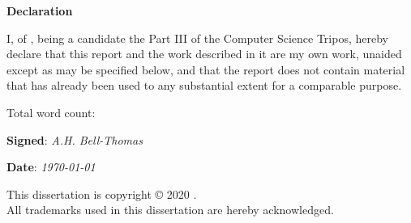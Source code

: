 \newpage
{\Huge \bf Declaration}

\vspace{24pt} 

I, \authorname of \authorcollege, being a candidate the Part III of
the Computer Science Tripos, hereby declare that this report and the
work described in it are my own work, unaided except as may be
specified below, and that the report does not contain material that
has already been used to any substantial extent for a comparable
purpose.

\vspace{24pt}
Total word count: \wordcount

\vspace{60pt}
\textbf{Signed}: \textit{A.H. Bell-Thomas}

\vspace{12pt}
\textbf{Date}: \textit{\today}


\vfill

This dissertation is copyright \copyright{} 2020 \authorname. 
\\
All trademarks used in this dissertation are hereby acknowledged.



\newpage
\vspace*{\fill}
